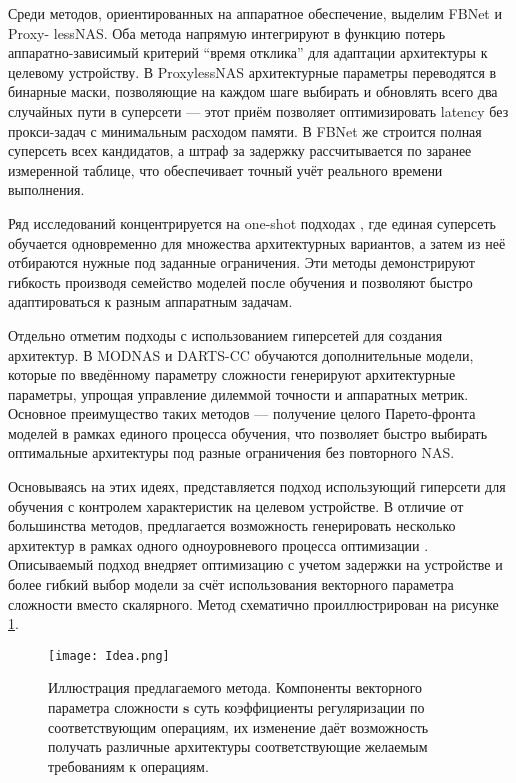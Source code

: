 \documentclass{article}
\begin{document}
Среди методов, ориентированных на аппаратное обеспечение, выделим FBNet \cite{Wu_2019_CVPR} и Proxy- lessNAS\cite{proxylessnas}. Оба метода напрямую интегрируют в функцию потерь аппаратно-зависимый критерий ``время отклика'' для адаптации архитектуры к целевому устройству. В ProxylessNAS архитектурные параметры переводятся в бинарные маски, позволяющие на каждом шаге выбирать и обновлять всего два случайных пути в суперсети --- этот приём позволяет оптимизировать latency без прокси-задач с минимальным расходом памяти. %
В FBNet же строится полная суперсеть всех кандидатов, а штраф за задержку рассчитывается по заранее измеренной таблице, что обеспечивает точный учёт реального времени выполнения. %

Ряд исследований концентрируется на one-shot подходах \cite{Cai2020OnceForAll, Dong2021BigNAS}, где единая суперсеть обучается одновременно для множества архитектурных вариантов, а затем из неё отбираются нужные под заданные ограничения. Эти методы демонстрируют  гибкость производя семейство моделей после обучения и позволяют быстро адаптироваться к разным аппаратным задачам. %

Отдельно отметим подходы с использованием гиперсетей для создания архитектур. В MODNAS \cite{Li2021MODNAS} и DARTS-CC \cite{yakovlev2021neural} обучаются дополнительные модели, которые по введённому параметру сложности генерируют архитектурные параметры, упрощая управление дилеммой точности и аппаратных метрик. Основное преимущество таких методов --- получение целого Парето‐фронта моделей в рамках единого процесса обучения, что позволяет быстро выбирать оптимальные архитектуры под разные ограничения без повторного NAS.

Основываясь на этих идеях, представляется подход использующий гиперсети для обучения с контролем характеристик на целевом устройстве. В отличие от большинства методов, предлагается возможность генерировать несколько архитектур в рамках одного одноуровневого процесса оптимизации \cite{yakovlev2021neural,Li2021MODNAS}. Описываемый подход внедряет оптимизацию с учетом задержки на устройстве\cite{Wu_2019_CVPR,proxylessnas} и более гибкий выбор модели за счёт использования векторного параметра сложности вместо скалярного. Метод схематично проиллюстрирован на рисунке \ref{fig1}.  
\begin{figure}[!ht]
    \centering
    \texttt{[image: Idea.png]}
    \caption{Иллюстрация предлагаемого метода. Компоненты векторного параметра сложности $\boldsymbol{s}$ суть коэффициенты регуляризации по соответствующим операциям, их изменение даёт возможность получать различные архитектуры соответствующие желаемым требованиям к операциям. }
    \label{fig1}
\end{figure}
\end{document}
